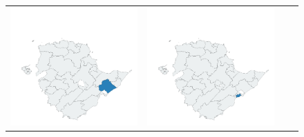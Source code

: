 \begin{figure}[p]
\begin{tabularx}{1\textwidth}{XXXX}
\includegraphics[width=1\linewidth]{images/ch6/loading/19}&
\includegraphics[width=1\linewidth]{images/ch6/loading/20} \\

\end{tabularx}
\end{figure}
